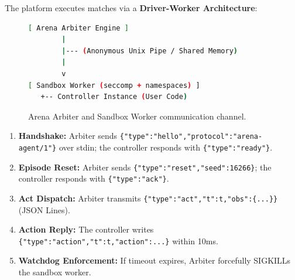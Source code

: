 \documentclass[11pt,a4paper]{article}
\begin{document}
The platform executes matches via a \textbf{Driver-Worker Architecture}:

\begin{figure}[htbp]
\centering
\begin{lstlisting}[language=bash]
[ Arena Arbiter Engine ]
        |
        |--- (Anonymous Unix Pipe / Shared Memory)
        |
        v
[ Sandbox Worker (seccomp + namespaces) ]
   +-- Controller Instance (User Code)
\end{lstlisting}
\caption{Arena Arbiter and Sandbox Worker communication channel.}
\label{fig:ipc_arch}
\end{figure}

\begin{enumerate}
    \item \textbf{Handshake:} Arbiter sends \texttt{\{"type":"hello","protocol":"arena-agent/1"\}} over stdin; the controller responds with \texttt{\{"type":"ready"\}}.
    \item \textbf{Episode Reset:} Arbiter sends \texttt{\{"type":"reset","seed":16266\}}; the controller responds with \texttt{\{"type":"ack"\}}.
    \item \textbf{Act Dispatch:} Arbiter transmits \texttt{\{"type":"act","t":t,"obs":\{...\}\}} (JSON Lines).
    \item \textbf{Action Reply:} The controller writes \texttt{\{"type":"action","t":t,"action":...\}} within 10ms.
    \item \textbf{Watchdog Enforcement:} If timeout expires, Arbiter forcefully SIGKILLs the sandbox worker.
\end{enumerate}
\end{document}
